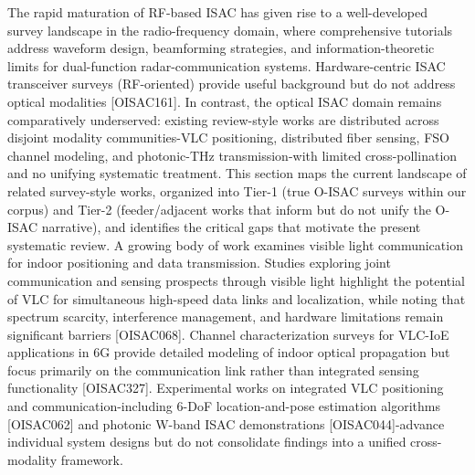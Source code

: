 {}
\markdownRendererSectionEnd \markdownRendererSectionBegin
{}\markdownRendererInterblockSeparator
{}The rapid maturation of RF-based ISAC has given rise to a well-developed survey landscape in the radio-frequency domain, where comprehensive tutorials address waveform design, beamforming strategies, and information-theoretic limits for dual-function radar-communication systems. Hardware-centric ISAC transceiver surveys (RF-oriented) provide useful background but do not address optical modalities [O\markdownRendererUnderscore{}ISAC\markdownRendererUnderscore{}161]. In contrast, the optical ISAC domain remains comparatively underserved: existing review-style works are distributed across disjoint modality communities-VLC positioning, distributed fiber sensing, FSO channel modeling, and photonic-THz transmission-with limited cross-pollination and no unifying systematic treatment. This section maps the current landscape of related survey-style works, organized into Tier-1 (true O-ISAC surveys within our corpus) and Tier-2 (feeder/adjacent works that inform but do not unify the O-ISAC narrative), and identifies the critical gaps that motivate the present systematic review.\markdownRendererParagraphSeparator
{} A growing body of work examines visible light communication for indoor positioning and data transmission. Studies exploring joint communication and sensing prospects through visible light highlight the potential of VLC for simultaneous high-speed data links and localization, while noting that spectrum scarcity, interference management, and hardware limitations remain significant barriers [O\markdownRendererUnderscore{}ISAC\markdownRendererUnderscore{}068]. Channel characterization surveys for VLC-IoE applications in 6G provide detailed modeling of indoor optical propagation but focus primarily on the communication link rather than integrated sensing functionality [O\markdownRendererUnderscore{}ISAC\markdownRendererUnderscore{}327]. Experimental works on integrated VLC positioning and communication-including 6-DoF location-and-pose estimation algorithms [O\markdownRendererUnderscore{}ISAC\markdownRendererUnderscore{}062] and photonic W-band ISAC demonstrations [O\markdownRendererUnderscore{}ISAC\markdownRendererUnderscore{}044]-advance individual system designs but do not consolidate findings into a unified cross-modality framework.\markdownRendererParagraphSeparator
